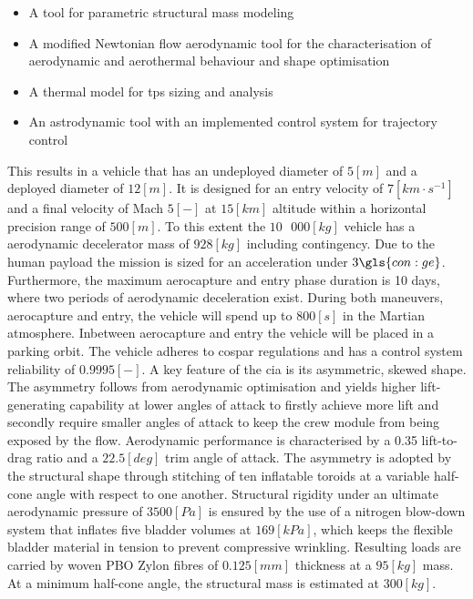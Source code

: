 \begin{itemize}
\item A tool for parametric structural mass modeling
\item A modified Newtonian flow aerodynamic tool for the characterisation of aerodynamic and aerothermal behaviour and shape optimisation
\item A thermal model for \acrfull{tps} sizing and analysis
\item An astrodynamic tool with an implemented control system for trajectory control
\end{itemize}
\vspace{1mm}
This results in a vehicle that has an undeployed diameter of $5 \left[ m \right] $ and a deployed diameter of $12 \left[ m \right]$. It is designed for an entry velocity of $7 \left[ km \cdot s^{-1} \right]$ and a final velocity of Mach $5 \left[-\right]$ at  $15 \left[ km \right] $ altitude within a horizontal precision range of $500 \left[ m \right]$. To this extent the $10\mbox{ }000 \left[ kg \right]$ vehicle has a aerodynamic decelerator mass of $928 \left[ kg \right] $ including contingency. Due to the human payload the mission is sized for an acceleration under $3 \gls{con:ge}$. Furthermore, the maximum aerocapture and entry phase duration is 10 days, where two periods of aerodynamic deceleration exist. During both maneuvers, aerocapture and entry, the vehicle will spend up to $800 \left[ s \right]$ in the Martian atmosphere. Inbetween aerocapture and entry the vehicle will be placed in a parking orbit. The vehicle adheres to \acrshort{cospar} regulations and has a control system reliability of $0.9995 \left[ - \right] $.
\newline
\newline
A key feature of the \acrshort{cia} is its asymmetric, skewed shape. The asymmetry follows from aerodynamic optimisation and yields higher lift-generating capability at lower angles of attack to firstly achieve more lift and secondly require smaller angles of attack to keep the crew module from being exposed by the flow. Aerodynamic performance is characterised by a 0.35 lift-to-drag ratio and a $22.5\left[deg\right]$ trim angle of attack.
\newline
\newline
The asymmetry is adopted by the structural shape through stitching of ten inflatable toroids at a variable half-cone angle with respect to one another. Structural rigidity under an ultimate aerodynamic pressure of $3500 \left[Pa\right]$ is ensured by the use of a nitrogen blow-down system that inflates five bladder volumes at $169 \left[kPa\right]$, which keeps the flexible bladder material in tension to prevent compressive wrinkling. Resulting loads are carried by woven PBO Zylon\textsuperscript{\textregistered} fibres of $0.125 \left[mm\right]$ thickness at a $95 \left[kg\right]$ mass. At a minimum half-cone angle, the structural mass is estimated at $300 \left[kg\right]$. 
